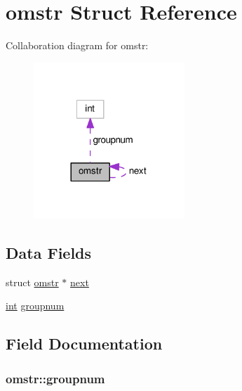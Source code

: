 \hypertarget{structomstr}{}\section{omstr Struct Reference}
\label{structomstr}


Collaboration diagram for omstr\+:
\nopagebreak
\begin{figure}[H]
\begin{center}
\leavevmode
\includegraphics[width=161pt]{structomstr__coll__graph}
\end{center}
\end{figure}
\subsection*{Data Fields}
\begin{DoxyCompactItemize}
\item 
struct \hyperlink{structomstr}{omstr} $\ast$ \hyperlink{structomstr_af0fdfa180fd622c0e3af2803cf548999}{next}
\item 
\hyperlink{pcre_8txt_a42dfa4ff673c82d8efe7144098fbc198}{int} \hyperlink{structomstr_a9e4857d439558bb0f97180eca46c4bbc}{groupnum}
\end{DoxyCompactItemize}


\subsection{Field Documentation}
\subsubsection[{\texorpdfstring{groupnum}{groupnum}}]{ omstr\+::groupnum}\hypertarget{structomstr_a9e4857d439558bb0f97180eca46c4bbc}{}\label{structomstr_a9e4857d439558bb0f97180eca46c4bbc}
